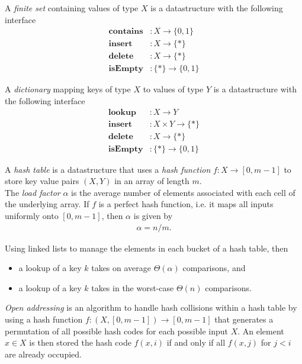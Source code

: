 \documentclass{article}
\begin{document}
\begin{definition}
	A \emph{finite set} containing values of type $X$ is a datastructure with the following interface
	\begin{align*}
		\textbf{contains} &: X\to \{0,1\}\\
		\textbf{insert} &: X \to \{*\}\\
		\textbf{delete} &: X \to \{*\}\\
		\textbf{isEmpty} &: \{*\} \to \{0,1\}
	\end{align*}
\end{definition}
\begin{definition}
	A \emph{dictionary} mapping keys of type $X$ to values of type $Y$
	is a datastructure with the following interface
	\begin{align*}
		\textbf{lookup} &: X \to Y\\
		\textbf{insert} &: X \times Y \to \{*\}\\
		\textbf{delete} &: X \to \{*\}\\
		\textbf{isEmpty} &: \{*\} \to \{0,1\}
	\end{align*}
\end{definition}
\begin{definition}
	A \emph{hash table} is a datastructure that uses a \emph{hash function} $f: X \to [0,m-1]$
	to store key value pairs $(X,Y)$ in an array of length $m$.\\
	The \emph{load factor} $\alpha$ is the average number of elements associated with each cell
	of the underlying array. If $f$ is a perfect hash function, i.e. it maps all inputs uniformly
	onto $[0,m-1]$, then $\alpha$ is given by 
	\begin{align*}
		\alpha = n / m.
	\end{align*}
\end{definition}
\begin{proposition}
	Using linked lists to manage the elements in each bucket of a hash table, then
	\begin{itemize}
		\item a lookup of a key $k$  takes on average $\Theta(\alpha)$ comparisons, and
		\item a lookup of a key $k$ takes in the worst-case $\Theta(n)$ comparisons.
	\end{itemize}
\end{proposition}
\begin{definition}
	\emph{Open addressing} is an algorithm to handle hash collisions within a hash table 
	by using a hash function $f: (X, [0,m-1]) \to [0,m-1]$ that generates a permutation of all possible
	hash codes for each possible input $X$. An element $x\in X$ is then stored the hash code $f(x, i)$
	if and only if all $f(x,j)$ for $j < i$ are already occupied.
\end{definition}
\end{document}
